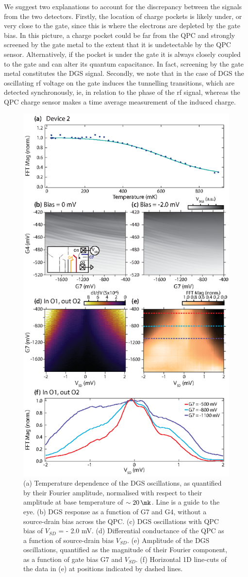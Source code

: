 We suggest two explanations to account for the discrepancy between the signals from the two detectors. Firstly, the location of charge pockets is likely under, or very close to the gate, since this is where the electrons are depleted by the gate bias. In this picture, a charge pocket could be far from the QPC and strongly screened by the gate metal to the extent that it is undetectable by the QPC sensor. Alternatively, if the pocket is under the gate it is always closely coupled to the gate and can alter its quantum capacitance. In fact, screening by the gate metal constitutes the DGS signal. Secondly, we note that in the case of DGS the oscillating rf voltage on the gate induces the tunnelling transitions, which are detected synchronously, ie, in relation to the phase of the rf signal, whereas the QPC charge sensor makes a time average measurement of the induced charge.

\begin{figure}
  \includegraphics[width=0.65\linewidth]{figure5}
  \caption{\label{fig:pock_fig5} (a) Temperature dependence of the DGS oscillations, as quantified by their Fourier amplitude, normalised with respect to their amplitude at base temperature of $\sim \SI{20}{\mk}$. Line is a guide to the eye. (b) DGS response as a function of G7 and G4, without a source-drain bias across the QPC. (c) DGS oscillations with QPC bias of $V_{SD}$ = - 2.0 mV. (d) Differential conductance of the QPC as a function of source-drain bias $V_{SD}$. (e) Amplitude of the DGS oscillations, quantified as the magnitude of their Fourier component, as a function of gate bias G7 and $V_{SD}$. (f) Horizontal 1D line-cuts of the data in (e) at positions indicated by dashed lines.}
\end{figure}

